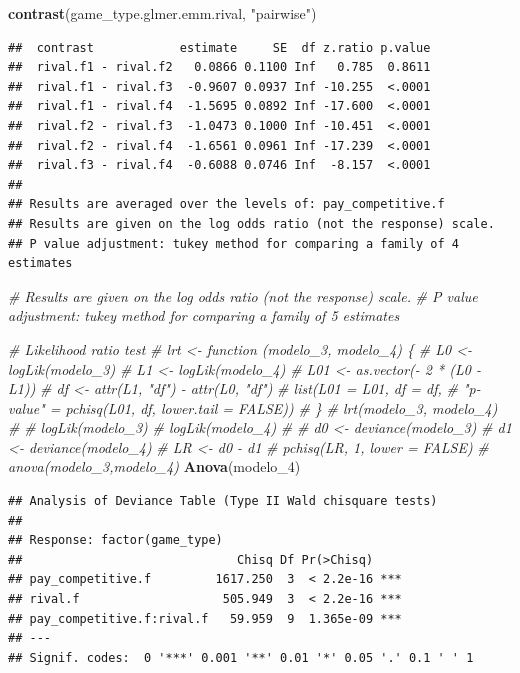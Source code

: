 \documentclass[
]{article}
\newenvironment{Shaded}{\begin{snugshade}}{\end{snugshade}}
\newcommand{\CommentTok}[1]{\textcolor[rgb]{0.56,0.35,0.01}{\textit{#1}}}
\newcommand{\FunctionTok}[1]{\textcolor[rgb]{0.13,0.29,0.53}{\textbf{#1}}}
\newcommand{\NormalTok}[1]{#1}
\newcommand{\StringTok}[1]{\textcolor[rgb]{0.31,0.60,0.02}{#1}}
\begin{document}
\begin{Shaded}
\begin{Highlighting}[]
\FunctionTok{contrast}\NormalTok{(game\_type.glmer.emm.rival, }\StringTok{"pairwise"}\NormalTok{)}
\end{Highlighting}
\end{Shaded}

\begin{verbatim}
##  contrast            estimate     SE  df z.ratio p.value
##  rival.f1 - rival.f2   0.0866 0.1100 Inf   0.785  0.8611
##  rival.f1 - rival.f3  -0.9607 0.0937 Inf -10.255  <.0001
##  rival.f1 - rival.f4  -1.5695 0.0892 Inf -17.600  <.0001
##  rival.f2 - rival.f3  -1.0473 0.1000 Inf -10.451  <.0001
##  rival.f2 - rival.f4  -1.6561 0.0961 Inf -17.239  <.0001
##  rival.f3 - rival.f4  -0.6088 0.0746 Inf  -8.157  <.0001
## 
## Results are averaged over the levels of: pay_competitive.f 
## Results are given on the log odds ratio (not the response) scale. 
## P value adjustment: tukey method for comparing a family of 4 estimates
\end{verbatim}

\begin{Shaded}
\begin{Highlighting}[]
\CommentTok{\# Results are given on the log odds ratio (not the response) scale. }
\CommentTok{\# P value adjustment: tukey method for comparing a family of 5 estimates }
 

\CommentTok{\# Likelihood ratio test}
\CommentTok{\# lrt \textless{}{-} function (modelo\_3, modelo\_4) \{}
\CommentTok{\#   L0 \textless{}{-} logLik(modelo\_3)}
\CommentTok{\#   L1 \textless{}{-} logLik(modelo\_4)}
\CommentTok{\#   L01 \textless{}{-} as.vector({-} 2 * (L0 {-} L1))}
\CommentTok{\#   df \textless{}{-} attr(L1, "df") {-} attr(L0, "df")}
\CommentTok{\#   list(L01 = L01, df = df,}
\CommentTok{\#        "p{-}value" = pchisq(L01, df, lower.tail = FALSE))}
\CommentTok{\#   \}}
\CommentTok{\# lrt(modelo\_3, modelo\_4)}
\CommentTok{\# }
\CommentTok{\# logLik(modelo\_3)}
\CommentTok{\# logLik(modelo\_4)}
\CommentTok{\# }
\CommentTok{\# d0 \textless{}{-} deviance(modelo\_3)}
\CommentTok{\# d1 \textless{}{-} deviance(modelo\_4)}
\CommentTok{\# LR \textless{}{-} d0 {-} d1}
\CommentTok{\# pchisq(LR, 1, lower = FALSE)}
\CommentTok{\# anova(modelo\_3,modelo\_4)}
\FunctionTok{Anova}\NormalTok{(modelo\_4)}
\end{Highlighting}
\end{Shaded}

\begin{verbatim}
## Analysis of Deviance Table (Type II Wald chisquare tests)
## 
## Response: factor(game_type)
##                              Chisq Df Pr(>Chisq)    
## pay_competitive.f         1617.250  3  < 2.2e-16 ***
## rival.f                    505.949  3  < 2.2e-16 ***
## pay_competitive.f:rival.f   59.959  9  1.365e-09 ***
## ---
## Signif. codes:  0 '***' 0.001 '**' 0.01 '*' 0.05 '.' 0.1 ' ' 1
\end{verbatim}
\end{document}
